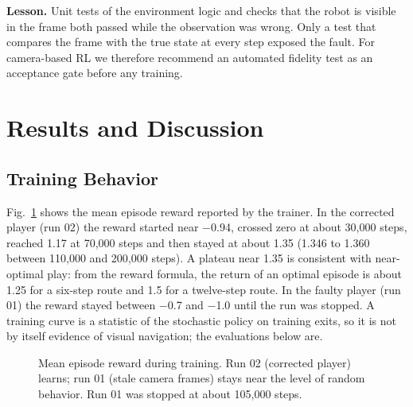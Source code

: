 \documentclass[conference]{IEEEtran}
\begin{document}
\textbf{Lesson.} Unit tests of the environment logic and checks that the robot is visible in the frame both passed while the observation was wrong. Only a test that compares the frame with the true state at every step exposed the fault. For camera-based RL we therefore recommend an automated fidelity test as an acceptance gate before any training.


\section{Results and Discussion}\label{sec:results}

\subsection{Training Behavior}
Fig.~\ref{fig:curve} shows the mean episode reward reported by the trainer. In the corrected player (run 02) the reward started near $-$0.94, crossed zero at about 30,000 steps, reached 1.17 at 70,000 steps and then stayed at about 1.35 (1.346 to 1.360 between 110,000 and 200,000 steps). A plateau near 1.35 is consistent with near-optimal play: from the reward formula, the return of an optimal episode is about 1.25 for a six-step route and 1.5 for a twelve-step route. In the faulty player (run 01) the reward stayed between $-$0.7 and $-$1.0 until the run was stopped. A training curve is a statistic of the stochastic policy on training exits, so it is not by itself evidence of visual navigation; the evaluations below are.

\begin{figure}[!t]
\centering
{}
\caption{Mean episode reward during training. Run 02 (corrected player) learns; run 01 (stale camera frames) stays near the level of random behavior. Run 01 was stopped at about 105,000 steps.}
\label{fig:curve}
\end{figure}
\end{document}
